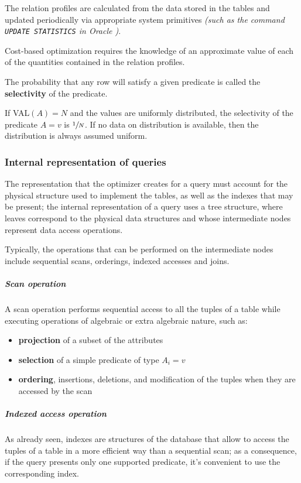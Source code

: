 \documentclass[english]{article}
\begin{document}
The relation profiles are calculated from the data stored in the tables and updated periodically via appropriate system primitives \textit{(such as the command \texttt{UPDATE STATISTICS} in Oracle \dbms)}.

Cost-based optimization requires the knowledge of an approximate value of each of the quantities contained in the relation profiles.

\bigskip
The probability that any row will satisfy a given predicate is called the \textbf{selectivity} of the predicate.

If VAL\((A) = N\) and the values are uniformly distributed, the selectivity of the predicate \(A = v\) is \(\sfrac{1}{N}\).
If no data on distribution is available, then the distribution is always assumed uniform.

\subsubsection{Internal representation of queries}

The representation that the optimizer creates for a query must account for the physical structure used to implement the tables, as well as the indexes that may be present;
the internal representation of a query uses a tree structure, where leaves correspond to the physical data structures and whose intermediate nodes represent data access operations.

Typically, the operations that can be performed on the intermediate nodes include sequential scans, orderings, indexed accesses and joins.

\subparagraph*{Scan operation}
A scan operation performs sequential access to all the tuples of a table while executing operations of algebraic or extra algebraic nature, such as:

\begin{itemize}
  \item \textbf{projection} of a subset of the attributes
  \item \textbf{selection} of a simple predicate of type \(A_i = v\)
  \item \textbf{ordering}, insertions, deletions, and modification of the tuples when they are accessed by the scan
\end{itemize}

\subparagraph*{Indexed access operation}
As already seen, indexes are structures of the database that allow to access the tuples of a table in a more efficient way than a sequential scan;
as a consequence, if the query presents only one supported predicate, it's convenient to use the corresponding index.
\end{document}
